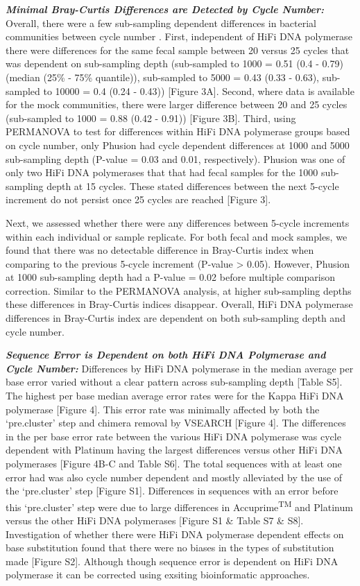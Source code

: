 \documentclass[12pt,]{article}
\begin{document}
\textbf{\emph{Minimal Bray-Curtis Differences are Detected by Cycle
Number:}} Overall, there were a few sub-sampling dependent differences
in bacterial communities between cycle number . First, independent of
HiFi DNA polymerase there were differences for the same fecal sample
between 20 versus 25 cycles that was dependent on sub-sampling depth
(sub-sampled to 1000 = 0.51 (0.4 - 0.79) (median (25\% - 75\%
quantile)), sub-sampled to 5000 = 0.43 (0.33 - 0.63), sub-sampled to
10000 = 0.4 (0.24 - 0.43)) {[}Figure 3A{]}. Second, where data is
available for the mock communities, there were larger difference between
20 and 25 cycles (sub-sampled to 1000 = 0.88 (0.42 - 0.91)) {[}Figure
3B{]}. Third, using PERMANOVA to test for differences within HiFi DNA
polymerase groups based on cycle number, only Phusion had cycle
dependent differences at 1000 and 5000 sub-sampling depth (P-value =
0.03 and 0.01, respectively). Phusion was one of only two HiFi DNA
polymerases that that had fecal samples for the 1000 sub-sampling depth
at 15 cycles. These stated differences between the next 5-cycle
increment do not persist once 25 cycles are reached {[}Figure 3{]}.

Next, we assessed whether there were any differences between 5-cycle
increments within each individual or sample replicate. For both fecal
and mock samples, we found that there was no detectable difference in
Bray-Curtis index when comparing to the previous 5-cycle increment
(P-value \textgreater{} 0.05). However, Phusion at 1000 sub-sampling
depth had a P-value = 0.02 before multiple comparison correction.
Similar to the PERMANOVA analysis, at higher sub-sampling depths these
differences in Bray-Curtis indices disappear. Overall, HiFi DNA
polymerase differences in Bray-Curtis index are dependent on both
sub-sampling depth and cycle number.

\textbf{\emph{Sequence Error is Dependent on both HiFi DNA Polymerase
and Cycle Number:}} Differences by HiFi DNA polymerase in the median
average per base error varied without a clear pattern across
sub-sampling depth {[}Table S5{]}. The highest per base median average
error rates were for the Kappa HiFi DNA polymerase {[}Figure 4{]}. This
error rate was minimally affected by both the `pre.cluster' step and
chimera removal by VSEARCH {[}Figure 4{]}. The differences in the per
base error rate between the various HiFi DNA polymerase was cycle
dependent with Platinum having the largest differences versus other HiFi
DNA polymerases {[}Figure 4B-C and Table S6{]}. The total sequences with
at least one error had was also cycle number dependent and mostly
alleviated by the use of the `pre.cluster' step {[}Figure S1{]}.
Differences in sequences with an error before this `pre.cluster' step
were due to large differences in Accuprime\textsuperscript{TM} and
Platinum versus the other HiFi DNA polymerases {[}Figure S1 \& Table S7
\& S8{]}. Investigation of whether there were HiFi DNA polymerase
dependent effects on base substitution found that there were no biases
in the types of substitution made {[}Figure S2{]}. Although though
sequence error is dependent on HiFi DNA polymerase it can be corrected
using exsiting bioinformatic approaches.
\end{document}
